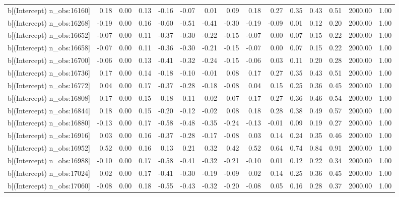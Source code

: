 \begin{table}[ht]
\begin{tabular}{rrrrrrrrrrrrrrr}
  b[(Intercept) n\_obs:16160] & 0.18 & 0.00 & 0.13 & -0.16 & -0.07 & 0.01 & 0.09 & 0.18 & 0.27 & 0.35 & 0.43 & 0.51 & 2000.00 & 1.00 \\ 
  b[(Intercept) n\_obs:16268] & -0.19 & 0.00 & 0.16 & -0.60 & -0.51 & -0.41 & -0.30 & -0.19 & -0.09 & 0.01 & 0.12 & 0.20 & 2000.00 & 1.00 \\ 
  b[(Intercept) n\_obs:16652] & -0.07 & 0.00 & 0.11 & -0.37 & -0.30 & -0.22 & -0.15 & -0.07 & 0.00 & 0.07 & 0.15 & 0.22 & 2000.00 & 1.00 \\ 
  b[(Intercept) n\_obs:16658] & -0.07 & 0.00 & 0.11 & -0.36 & -0.30 & -0.21 & -0.15 & -0.07 & 0.00 & 0.07 & 0.15 & 0.22 & 2000.00 & 1.00 \\ 
  b[(Intercept) n\_obs:16700] & -0.06 & 0.00 & 0.13 & -0.41 & -0.32 & -0.24 & -0.15 & -0.06 & 0.03 & 0.11 & 0.20 & 0.28 & 2000.00 & 1.00 \\ 
  b[(Intercept) n\_obs:16736] & 0.17 & 0.00 & 0.14 & -0.18 & -0.10 & -0.01 & 0.08 & 0.17 & 0.27 & 0.35 & 0.43 & 0.51 & 2000.00 & 1.00 \\ 
  b[(Intercept) n\_obs:16772] & 0.04 & 0.00 & 0.17 & -0.37 & -0.28 & -0.18 & -0.08 & 0.04 & 0.15 & 0.25 & 0.36 & 0.45 & 2000.00 & 1.00 \\ 
  b[(Intercept) n\_obs:16808] & 0.17 & 0.00 & 0.15 & -0.18 & -0.11 & -0.02 & 0.07 & 0.17 & 0.27 & 0.36 & 0.46 & 0.54 & 2000.00 & 1.00 \\ 
  b[(Intercept) n\_obs:16844] & 0.18 & 0.00 & 0.15 & -0.20 & -0.12 & -0.02 & 0.08 & 0.18 & 0.28 & 0.38 & 0.49 & 0.57 & 2000.00 & 1.00 \\ 
  b[(Intercept) n\_obs:16880] & -0.13 & 0.00 & 0.17 & -0.58 & -0.48 & -0.35 & -0.24 & -0.13 & -0.01 & 0.09 & 0.19 & 0.27 & 2000.00 & 1.00 \\ 
  b[(Intercept) n\_obs:16916] & 0.03 & 0.00 & 0.16 & -0.37 & -0.28 & -0.17 & -0.08 & 0.03 & 0.14 & 0.24 & 0.35 & 0.46 & 2000.00 & 1.00 \\ 
  b[(Intercept) n\_obs:16952] & 0.52 & 0.00 & 0.16 & 0.13 & 0.21 & 0.32 & 0.42 & 0.52 & 0.64 & 0.74 & 0.84 & 0.91 & 2000.00 & 1.00 \\ 
  b[(Intercept) n\_obs:16988] & -0.10 & 0.00 & 0.17 & -0.58 & -0.41 & -0.32 & -0.21 & -0.10 & 0.01 & 0.12 & 0.22 & 0.34 & 2000.00 & 1.00 \\ 
  b[(Intercept) n\_obs:17024] & 0.02 & 0.00 & 0.17 & -0.41 & -0.30 & -0.19 & -0.09 & 0.02 & 0.14 & 0.25 & 0.36 & 0.45 & 2000.00 & 1.00 \\ 
  b[(Intercept) n\_obs:17060] & -0.08 & 0.00 & 0.18 & -0.55 & -0.43 & -0.32 & -0.20 & -0.08 & 0.05 & 0.16 & 0.28 & 0.37 & 2000.00 & 1.00 \\ 

\end{tabular}
\end{table}
